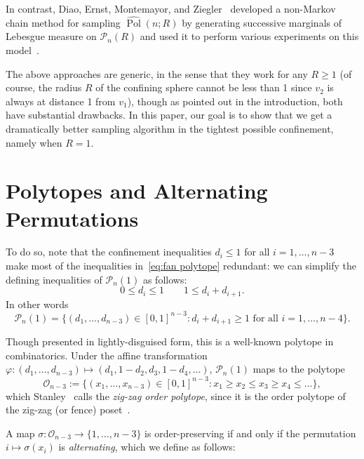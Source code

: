 \documentclass{article}
\theoremstyle{definition}
\newcommand{\Polhat}{\widehat{\operatorname{Pol}}}
\begin{document}
In contrast, Diao, Ernst, Montemayor, and Ziegler~\cite{diaoGeneratingEquilateralRandom2011} developed a non-Markov chain method for sampling $\Polhat(n;R)$ by generating successive marginals of Lebesgue measure on $\mathcal{P}_n(R)$ and used it to perform various experiments on this model~\cite{diaoGeneratingEquilateralRandom2012a,diaoGeneratingEquilateralRandom2012,diaoRandomWalksPolygons2014,diaoKnotSpectrumConfined2014,diaoTotalCurvatureTotal2018,diaoRelativeFrequenciesAlternating2018,ernstKnottingSpectrumPolygonal2021,diaoAverageCrossingNumber2018}.

The above approaches are generic, in the sense that they work for any $R \geq 1$ (of course, the radius $R$ of the confining sphere cannot be less than 1 since $v_2$ is always at distance 1 from $v_1$), though as pointed out in the introduction, both have substantial drawbacks. In this paper, our goal is to show that we get a dramatically better sampling algorithm in the tightest possible confinement, namely when $R=1$.

\section{Polytopes and Alternating Permutations}
\label{sec:polytopes and permutations}

To do so, note that the confinement inequalities $d_i \leq 1$ for all $i=1, \dots , n-3$ make most of the inequalities in~\eqref{eq:fan polytope} redundant: we can simplify the defining inequalities of $\mathcal{P}_n(1)$ as follows:
\begin{equation}\label{eq:confined inequalities}
	0 \leq d_i \leq 1 \qquad 1 \leq d_i + d_{i+1}.
\end{equation}
In other words
\[
	\mathcal{P}_n(1) = \{(d_1, \dots , d_{n-3}) \in [0,1]^{n-3} : d_i + d_{i+1} \geq 1 \text{ for all } i = 1, \dots , n-4\}.
\]

Though presented in lightly-disguised form, this is a well-known polytope in combinatorics. Under the affine transformation $\varphi: (d_1, \dots , d_{n-3}) \mapsto (d_1, 1-d_2, d_3, 1-d_4, \dots)$, $\mathcal{P}_n(1)$ maps to the polytope
\[
	\mathcal{O}_{n-3} := \{(x_1, \dots , x_{n-3}) \in [0,1]^{n-3} : x_1 \geq x_2 \leq x_3 \geq x_4 \leq \dots \},
\]
which Stanley~\cite[Section~3.8]{stanleySurveyAlternatingPermutations2010} calls the \emph{zig-zag order polytope}, since it is the order polytope of the zig-zag (or fence) poset~\cite[Example~4.3]{stanleyTwoPosetPolytopes1986}.

A map $\sigma: \mathcal{O}_{n-3} \to \{1,\dots, n-3\}$ is order-preserving if and only if the permutation $i \mapsto \sigma(x_i)$ is \emph{alternating}, which we define as follows:
\end{document}
